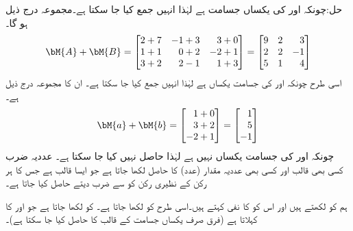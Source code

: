 حل:چونکہ  اور  کی یکساں جسامت ہے لہٰذا انہیں جمع کیا جا سکتا ہے۔مجموعہ درج ذیل ہو گا۔
\begin{align*}
\bM{A}+\bM{B}=
\begin{bmatrix*}[r]
2+7&-1+3&3+0\\
1+1&0+2&-2+1\\
3+2&2-1&1+3
\end{bmatrix*}
=
\begin{bmatrix*}[r]
9&2&3\\
2&2&-1\\
5&1&4
\end{bmatrix*}
\end{align*}
اسی طرح چونکہ  اور  کی جسامت یکساں ہے لہٰذا انہیں جمع  کیا جا سکتا ہے۔ ان کا مجموعہ درج ذیل ہے۔
\begin{align*}
\bM{a}+\bM{b}=
\begin{bmatrix*}[r]
1+0\\
3+2\\
-2+1
\end{bmatrix*}=
\begin{bmatrix*}[r]
1\\
5\\
-1
\end{bmatrix*}
\end{align*}
چونکہ  اور  کی جسامت یکساں نہیں ہے لہٰذا  حاصل نہیں کیا جا سکتا ہے۔
\quad عددیہ ضرب\\
کسی بھی  قالب  اور کسی بھی عددیہ مقدار (عدد)  کا حاصل   لکھا جاتا ہے جو ایسا  قالب  ہے جس کا ہر رکن  کے نظیری رکن کو  سے ضرب دیتے حاصل کیا جاتا ہے۔

ہم  کو  لکھتے ہیں اور اس کو  کا نفی کہتے ہیں۔اسی طرح  کو  لکھا جاتا ہے۔  کو  لکھا جاتا ہے جو  اور  کا  کہلاتا ہے (فرق صرف یکساں جسامت کے قالب کا حاصل کیا جا سکتا ہے)۔


